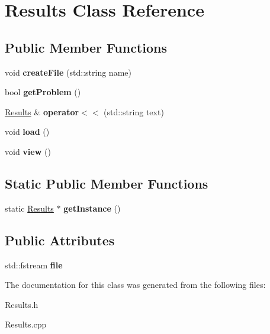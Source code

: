 \hypertarget{class_results}{}\section{Results Class Reference}
\label{class_results}
\subsection*{Public Member Functions}
\begin{DoxyCompactItemize}
\item 
\hypertarget{class_results_a524b63b8928aa4a85fb29b89197b4134}{}void {\bfseries create\+File} (std\+::string name)\label{class_results_a524b63b8928aa4a85fb29b89197b4134}

\item 
\hypertarget{class_results_a263e6cd51ac69ad6705c0f79f9179b63}{}bool {\bfseries get\+Problem} ()\label{class_results_a263e6cd51ac69ad6705c0f79f9179b63}

\item 
\hypertarget{class_results_a069effb369c067ea8a8e2b5b0a647e72}{}\hyperlink{class_results}{Results} \& {\bfseries operator$<$$<$} (std\+::string text)\label{class_results_a069effb369c067ea8a8e2b5b0a647e72}

\item 
\hypertarget{class_results_ab6d8f1711b2d9a611df1f5c460bd454a}{}void {\bfseries load} ()\label{class_results_ab6d8f1711b2d9a611df1f5c460bd454a}

\item 
\hypertarget{class_results_a546671884adf0df06f778cdb9752b453}{}void {\bfseries view} ()\label{class_results_a546671884adf0df06f778cdb9752b453}

\end{DoxyCompactItemize}
\subsection*{Static Public Member Functions}
\begin{DoxyCompactItemize}
\item 
\hypertarget{class_results_a489b09ca0e160c7d8d43c925a8a33b88}{}static \hyperlink{class_results}{Results} $\ast$ {\bfseries get\+Instance} ()\label{class_results_a489b09ca0e160c7d8d43c925a8a33b88}

\end{DoxyCompactItemize}
\subsection*{Public Attributes}
\begin{DoxyCompactItemize}
\item 
\hypertarget{class_results_ac3ea8baf9f877af886bb70b259ca464a}{}std\+::fstream {\bfseries file}\label{class_results_ac3ea8baf9f877af886bb70b259ca464a}

\end{DoxyCompactItemize}


The documentation for this class was generated from the following files\+:\begin{DoxyCompactItemize}
\item 
Results.\+h\item 
Results.\+cpp\end{DoxyCompactItemize}
